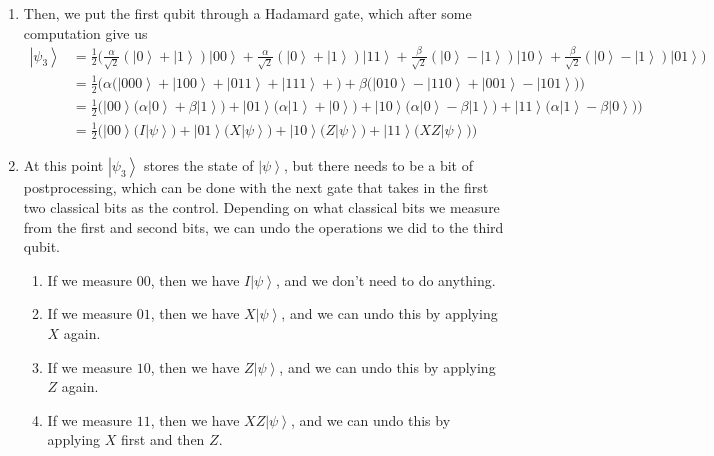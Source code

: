 \documentclass{article}
\newcommand{\ket}[1]{\ensuremath{\left|#1\right\rangle}}
\newcounter{theorem}[section]
\begin{document}
\begin{theorem}
\begin{enumerate}
\begin{align}
          \end{align}
        \item Then, we put the first qubit through a Hadamard gate, which after some computation give us 
          \begin{align*} 
            \ket{\psi_3} & = \frac{1}{2} \bigg( \frac{\alpha}{\sqrt{2}} (\ket{0} + \ket{1}) \ket{00} + \frac{\alpha}{\sqrt{2}} (\ket{0} + \ket{1}) \ket{11}  + \frac{\beta}{\sqrt{2}} (\ket{0} - \ket{1} ) \ket{10} + \frac{\beta}{\sqrt{2}} ( \ket{0} - \ket{1}) \ket{01} \bigg) \\
                         & = \frac{1}{2} \bigg( \alpha \big( \ket{000} + \ket{100} + \ket{011} + \ket{111} + \big) + \beta \big( \ket{010} - \ket{110} + \ket{001} - \ket{101} \big)\bigg) \\
                         & = \frac{1}{2} \bigg( \ket{00} \big( \alpha \ket{0} + \beta \ket{1} \big) + \ket{01} \big( \alpha \ket{1} + \ket{0} \big) + \ket{10} \big( \alpha \ket{0} - \beta \ket{1} \big) + \ket{11} \big( \alpha \ket{1} - \beta \ket{0} \big) \bigg) \\
                         & = \frac{1}{2} \bigg( \ket{00} \big( I \ket{\psi}\big) + \ket{01} \big( X \ket{\psi} \big)  + \ket{10} \big(Z \ket{\psi}\big) + \ket{11} \big( X Z \ket{\psi} \big) \bigg)
          \end{align*}
        \item At this point $\ket{\psi_3}$ stores the state of $\ket{\psi}$, but there needs to be a bit of postprocessing, which can be done with the next gate that takes in the first two classical bits as the control. Depending on what classical bits we measure from the first and second bits, we can undo the operations we did to the third qubit. 
          \begin{enumerate} 
            \item If we measure $00$, then we have $I \ket{\psi}$, and we don't need to do anything. 
            \item If we measure $01$, then we have $X \ket{\psi}$, and we can undo this by applying $X$ again. 
            \item If we measure $10$, then we have $Z \ket{\psi}$, and we can undo this by applying $Z$ again.
            \item If we measure $11$, then we have $X Z \ket{\psi}$, and we can undo this by applying $X$ first and then $Z$. 
          \end{enumerate}
      \end{enumerate}
    \end{theorem}
\end{document}
